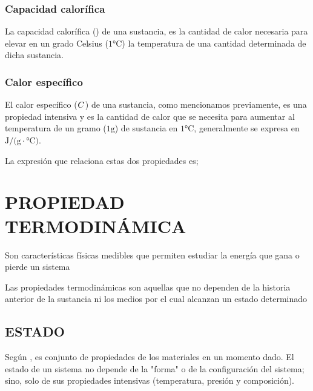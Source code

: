         \eqHeatChangeWithSpecificHeat

      \subsubsection{Capacidad calorífica}
        La capacidad calorífica (\heatCapacity[]{}) de una sustancia, es la cantidad de calor necesaria para elevar en un grado Celsius ($1 \unit{\celsius}$) la temperatura de una cantidad determinada de dicha sustancia.

      \subsubsection{Calor específico}
        El calor específico ($\specificHeat[]{}$) de una sustancia, como mencionamos previamente, es una propiedad intensiva y es la cantidad de calor que se necesita para aumentar al temperatura de un gramo ($1 \unit{\gram}$) de sustancia en $1 \unit{\celsius}$, generalmente se expresa en $\unit{\joule/(\gram \cdot \degreeCelsius)}$.    

      La expresión que relaciona estas dos propiedades es;
      
      \eqHeatCapacity

  \section{PROPIEDAD TERMODINÁMICA}
  Son características físicas medibles que permiten estudiar la energía que gana o pierde un sistema

   Las propiedades termodinámicas son aquellas que no dependen de la historia anterior de la sustancia ni los medios por el cual alcanzan un estado determinado


      



\subsection{ESTADO}
  Según \parencite[p. 391]{bib:Himmelblau1997}, es conjunto de propiedades de los materiales en un momento dado. El estado de un sistema no depende de la "forma" o de la configuración del sistema; sino, solo de sus propiedades intensivas (temperatura, presión y composición).



